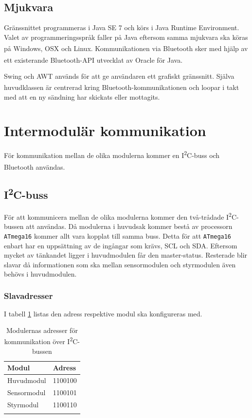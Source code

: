\documentclass[11pt]{article}
\begin{document}
\begin{flushleft}
\subsection{Mjukvara}
Gränssnittet programmeras i Java SE 7 och körs i Java Runtime Environment. Valet av programmeringsspråk faller på Java eftersom samma mjukvara ska köras på Windows, OSX och Linux. Kommunikationen via Bluetooth\textsuperscript{\circledR} sker med hjälp av ett existerande Bluetooth\textsuperscript{\circledR}-API utvecklat av Oracle för Java. 

Swing och AWT används för att ge användaren ett grafiskt gränssnitt. Själva huvudklassen är centrerad kring Bluetooth\textsuperscript{\circledR}-kommunikationen och loopar i takt med att en ny sändning har skickats eller mottagits. 

\pagebreak
\section{Intermodulär kommunikation}\label{Intermodulär kommunikation}
För kommunikation mellan de olika modulerna kommer en I\textsuperscript{2}C-buss och Bluetooth\textsuperscript{\circledR} användas. 

\subsection{I\textsuperscript{2}C-buss}

För att kommunicera mellan de olika modulerna kommer den två-trådade I\textsuperscript{2}C-bussen att användas. Då modulerna i huvudsak kommer bestå av processorn \verb+ATmega16+ kommer allt vara kopplat till samma buss. Detta för att \verb+ATmega16+ enbart har en uppsättning av de ingångar som krävs, SCL och SDA. Eftersom mycket av tänkandet ligger i huvudmodulen får den master-status. Resterade blir slavar då informationen som ska mellan sensormodulen och styrmodulen även behövs i huvudmodulen.

\subsubsection{Slavadresser}
I tabell \ref{slavAdress} listas den adress respektive modul ska konfigureras med. 

\begin{center}
\begin{longtable}{|l|l|} \hline
\textbf{Modul} & \textbf{Adress}\\ \hline 
Huvudmodul & 1100100 \\ \hline
Sensormodul & 1100101 \\ \hline
Styrmodul & 1100110\\ \hline
\caption{Modulernas adresser för kommunikation över I\textsuperscript{2}C-bussen}
\label{slavAdress}
\end{longtable}
\end{center}



\end{flushleft}
\end{document}
